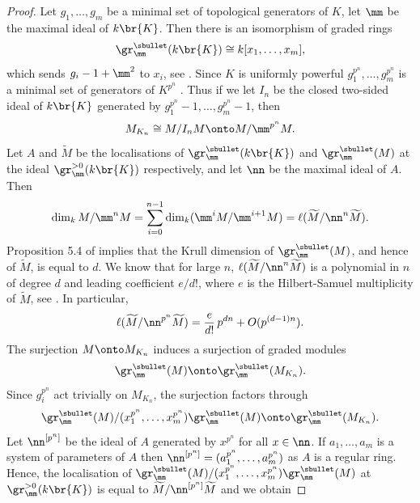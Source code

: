 \begin{proof} Let $g_1, \ldots, g_m$ be a minimal set of topological generators of $K$, let $\mm$ be the maximal ideal of $k\br{K}$. Then there is an isomorphism of graded rings
\[
\gr^{\sbullet}_{\mm} (k\br{K})\cong k[x_1, \ldots, x_m],
\]
which sends $g_i-1 +\mm^2$ to $x_i$, see \cite[Th.\,3.4]{ardakov_brown}. Since $K$ is uniformly powerful $g_1^{p^n}, \ldots, g_m^{p^n}$ is a minimal set of generators of $K^{p^n}$
\cite[Th.\,3.6\,(iii)]{analytic}. Thus if we let $I_n$ be the closed two-sided ideal of $k\br{K}$ generated by $g_1^{p^n}-1, \ldots, g_m^{p^n}-1$, then
\begin{equation}\label{du}
M_{K_n}\cong M/I_n M \onto M/\mm^{p^n} M.
\end{equation}
Let $A$ and $\widetilde{M}$ be the localisations of $ \gr^{\sbullet}_{\mm} (k\br{K})$ and $\gr^{\sbullet}_{\mm}(M)$
at the ideal $\gr^{>0}_{\mm} (k\br{K})$ respectively, and let $\nn$ be the maximal ideal of $A$. Then
\begin{equation}\label{trys}
\dim_ k M/\mm^n M=\sum_{i=0}^{n-1} \dim_k (\mm^i M/\mm^{i+1} M)= \ell(\widetilde{M}/\nn^n \widetilde{M}).
\end{equation}
Proposition 5.4 of \cite{ardakov_brown} implies that the Krull dimension of $\gr^{\sbullet}_{\mm}(M)$, and hence of $\widetilde{M}$, is equal to $d$. We know
that for large $n$, $\ell(\widetilde{M}/\nn^n \widetilde{M})$ is a polynomial in $n$ of degree $d$ and leading coefficient $e/d!$, where $e$ is the Hilbert-Samuel multiplicity
of $\widetilde{M}$, see \cite[\S14]{matsumura}. In particular,
\begin{equation}\label{keturi}
\ell(\widetilde{M}/\nn^{p^n} \widetilde{M}) = \frac{e}{d!}\, p^{dn} + O(p^{(d-1)n}).
\end{equation}
The surjection $M \onto M_{K_n}$ induces a surjection of graded modules
\[
\gr^{\sbullet}_{\mm}(M)\onto \gr^{\sbullet}_{\mm}(M_{K_n}).
\]
Since $g_i^{p^n}$ act trivially on $M_{K_n}$, the
surjection factors through
\begin{equation}\label{penki}
\gr^{\sbullet}_{\mm}(M)/(x_1^{p^n}, \ldots, x_m^{p^n})\gr^{\sbullet}_{\mm}(M) \onto \gr^{\sbullet}_{\mm}(M_{K_n}).
\end{equation}
Let $\nn^{[p^n]}$ be the ideal of $A$ generated by $x^{p^n}$ for all $x\in \nn$. If $a_1, \ldots, a_m$ is a system of parameters of $A$ then $\nn^{[p^n]}=(a_1^{p^n}, \ldots, a_m^{p^n})$ as $A$ is a regular ring.
Hence, the localisation of $\gr^{\sbullet}_{\mm}(M)/(x_1^{p^n}, \ldots, x_m^{p^n})\gr^{\sbullet}_{\mm}(M)$ at $ \gr^{>0}_{\mm} (k\br{K})$ is equal to $\widetilde{M}/\nn^{[p^n]} \widetilde{M}$ and we obtain

\end{proof}
